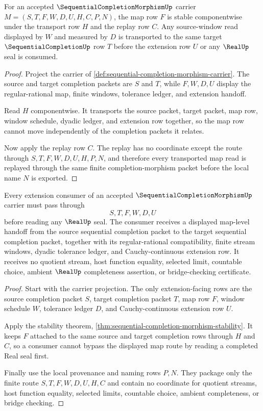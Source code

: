 \begin{theorem}
\label{thm:sequential-completion-morphism-stability}
For an accepted $\SequentialCompletionMorphismUp$ carrier $M=(S,T,F,W,D,U,H,C,P,N)$, the map row $F$ is stable componentwise under the transport row $H$ and the replay row $C$. Any source-window read displayed by $W$ and measured by $D$ is transported to the same target $\SequentialCompletionUp$ row $T$ before the extension row $U$ or any $\RealUp$ seal is consumed.
\end{theorem}
\begin{proof}
Project the carrier of \autoref{def:sequential-completion-morphism-carrier}. The source and target completion packets are $S$ and $T$, while $F,W,D,U$ display the regular-rational map, finite windows, tolerance ledger, and extension handoff.

Read $H$ componentwise. It transports the source packet, target packet, map row, window schedule, dyadic ledger, and extension row together, so the map row cannot move independently of the completion packets it relates.

Now apply the replay row $C$. The replay has no coordinate except the route through $S,T,F,W,D,U,H,P,N$, and therefore every transported map read is replayed through the same finite completion-morphism packet before the local name $N$ is exported.
\end{proof}

\begin{theorem}
\label{thm:sequential-completion-morphism-extension}
Every extension consumer of an accepted $\SequentialCompletionMorphismUp$ carrier must pass through
$$
S,T,F,W,D,U
$$
before reading any $\RealUp$ seal. The consumer receives a displayed map-level handoff from the source sequential completion packet to the target sequential completion packet, together with its regular-rational compatibility, finite stream windows, dyadic tolerance ledger, and Cauchy-continuous extension row. It receives no quotient stream, host function equality, selected limit, countable choice, ambient $\RealUp$ completeness assertion, or bridge-checking certificate.
\end{theorem}
\begin{proof}
Start with the carrier projection. The only extension-facing rows are the source completion packet $S$, target completion packet $T$, map row $F$, window schedule $W$, tolerance ledger $D$, and Cauchy-continuous extension row $U$.

Apply the stability theorem, \autoref{thm:sequential-completion-morphism-stability}. It keeps $F$ attached to the same source and target completion rows through $H$ and $C$, so a consumer cannot bypass the displayed map route by reading a completed Real seal first.

Finally use the local provenance and naming rows $P,N$. They package only the finite route $S,T,F,W,D,U,H,C$ and contain no coordinate for quotient streams, host function equality, selected limits, countable choice, ambient completeness, or bridge checking.
\end{proof}

